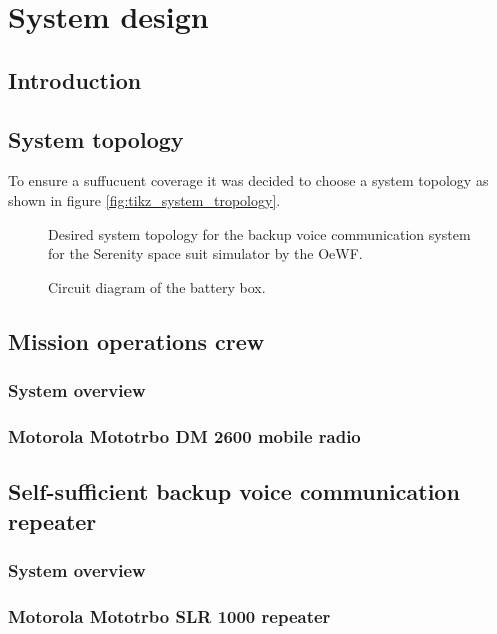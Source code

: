 \chapter{System design}

\section{Introduction}
\section{System topology}
To ensure a suffucuent coverage it was decided to choose a system topology as shown in figure \ref{fig:tikz_system_tropology}.

\begin{figure}[h!]
	\centering
	
	\caption{Desired system topology for the backup voice communication system for the Serenity space suit simulator by the OeWF.}
	\label{fig:tikz_system_topology}
\end{figure}

\begin{figure}[h!]
	\centering
	
	\caption{Circuit diagram of the battery box.}
	\label{fig:tikz_bvcr_battery_box_circuit_diagram}
\end{figure}

\section{Mission operations crew}
\subsection{System overview}
\subsection{Motorola Mototrbo DM 2600 mobile radio}

\section{Self-sufficient backup voice communication repeater}
\subsection{System overview}
\subsection{Motorola Mototrbo SLR 1000 repeater}
